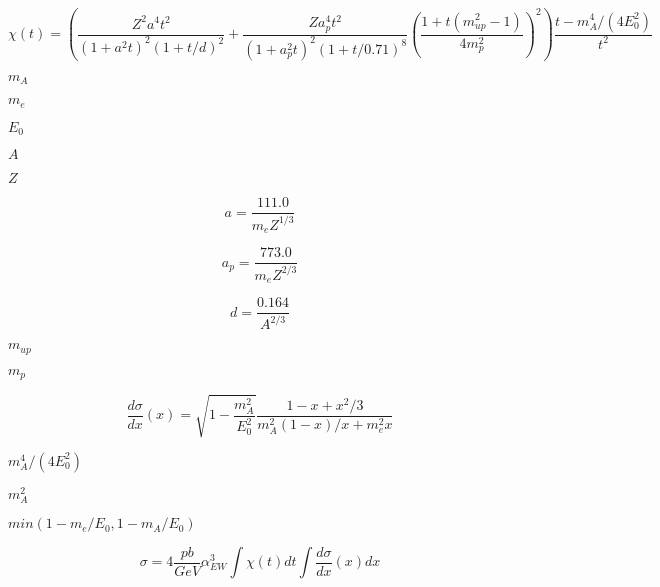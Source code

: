 \documentclass{article}
\begin{document}
\[ \chi(t) = \left( \frac{Z^2a^4t^2}{(1+a^2t)^2(1+t/d)^2}+\frac{Za_p^4t^2}{(1+a_p^2t)^2(1+t/0.71)^8}\left(\frac{1+t(m_{up}^2-1)}{4m_p^2}\right)^2\right)\frac{t-m_A^4/(4E_0^2)}{t^2} \]
\pagebreak

$m_A$
\pagebreak

$m_e$
\pagebreak

$E_0$
\pagebreak

$A$
\pagebreak

$Z$
\pagebreak

\[a = \frac{111.0}{m_e Z^{1/3}}\]
\pagebreak

\[a_p = \frac{773.0}{m_e Z^{2/3}}\]
\pagebreak

\[d = \frac{0.164}{A^{2/3}}\]
\pagebreak

$m_{up}$
\pagebreak

$m_{p}$
\pagebreak

\[ \frac{d\sigma}{dx}(x) = \sqrt{1-\frac{m_A^2}{E_0^2}}\frac{1-x+x^2/3}{m_A^2(1-x)/x+m_e^2x} \]
\pagebreak

$m_A^4/(4E_0^2)$
\pagebreak

$m_A^2$
\pagebreak

$min(1-m_e/E_0,1-m_A/E_0)$
\pagebreak

\[ \sigma = 4 \frac{pb}{GeV}\alpha_{EW}^3 \int \chi(t)dt \int \frac{d\sigma}{dx}(x)dx \]
\pagebreak
\end{document}
